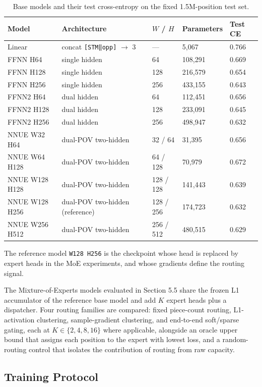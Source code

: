 \begin{table}[H]
\centering
\caption{Base models and their test cross-entropy on the fixed 1.5M-position test set.}
\small
\begin{tabular}{lllll}
\toprule
Model & Architecture & $W$ / $H$ & Parameters & Test CE \\
\midrule
Linear & concat \texttt{[STM‖opp]} $\to$ 3 & --- & 5,067 & 0.766 \\
FFNN H64 & single hidden & 64 & 108,291 & 0.669 \\
FFNN H128 & single hidden & 128 & 216,579 & 0.654 \\
FFNN H256 & single hidden & 256 & 433,155 & 0.643 \\
FFNN2 H64 & dual hidden & 64 & 112,451 & 0.656 \\
FFNN2 H128 & dual hidden & 128 & 233,091 & 0.645 \\
FFNN2 H256 & dual hidden & 256 & 498,947 & 0.632 \\
NNUE W32 H64 & dual-POV two-hidden & 32 / 64 & 31,395 & 0.656 \\
NNUE W64 H128 & dual-POV two-hidden & 64 / 128 & 70,979 & 0.672 \\
NNUE W128 H128 & dual-POV two-hidden & 128 / 128 & 141,443 & 0.639 \\
NNUE W128 H256 & dual-POV two-hidden (reference) & 128 / 256 & 174,723 & 0.632 \\
NNUE W256 H512 & dual-POV two-hidden & 256 / 512 & 480,515 & 0.629 \\
\bottomrule
\end{tabular}
\end{table}

The reference model \texttt{W128 H256} is the checkpoint whose head is replaced by expert heads in the MoE experiments, and whose gradients define the routing signal.


The Mixture-of-Experts models evaluated in Section 5.5 share the frozen L1 accumulator of the reference base model and add $K$ expert heads plus a dispatcher. Four routing families are compared: fixed piece-count routing, L1-activation clustering, sample-gradient clustering, and end-to-end soft/sparse gating, each at $K \in \{2,4,8,16\}$ where applicable, alongside an oracle upper bound that assigns each position to the expert with lowest loss, and a random-routing control that isolates the contribution of routing from raw capacity.

\subsection{Training Protocol}

